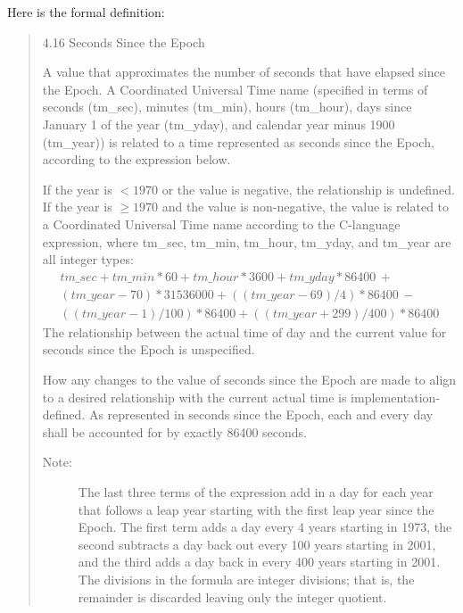 \documentclass[letterpaper,twoside]{article}
\begin{document}
Here is the formal definition:
\begin{quotation}

4.16 Seconds Since the Epoch

A value that approximates the number of seconds that have elapsed
since the Epoch. A Coordinated Universal Time name
(specified in terms of seconds (tm\_sec), minutes (tm\_min),
hours (tm\_hour), days since January 1 of the year (tm\_yday),
and calendar year minus 1900 (tm\_year)) is related to a time
represented as seconds since the Epoch, according to the expression below.

If the year is $<1970$ or the value is negative, the relationship is undefined.
If the year is $\geq 1970$ and the value is non-negative, the value is
related to a Coordinated Universal Time name according to the
C-language expression, where tm\_sec, tm\_min, tm\_hour, tm\_yday,
and tm\_year are all integer types:
\begin{multline*}
  tm\_sec + tm\_min*60 + tm\_hour*3600 + tm\_yday*86400 \,+ \\
    (tm\_year-70)*31536000 + ((tm\_year-69)/4)*86400 \,- \\
    ((tm\_year-1)/100)*86400 + ((tm\_year+299)/400)*86400
\end{multline*}
The relationship between the actual time of day and the current value
for seconds since the Epoch is unspecified.

How any changes to the value of seconds since the Epoch are made
to align to a desired relationship with the current actual time
is implementation-defined. As represented in seconds since the Epoch,
each and every day shall be accounted for by exactly \num{86400} seconds.

\begin{description}
\item[Note:]
The last three terms of the expression add in a day for each year
that follows a leap year starting with the first leap year since
the Epoch. The first term adds a day every 4 years starting in 1973,
the second subtracts a day back out every 100 years starting in 2001,
and the third adds a day back in every 400 years starting in 2001.
The divisions in the formula are integer divisions; that is, the
remainder is discarded leaving only the integer quotient.
\end{description}
\end{quotation}
\end{document}
